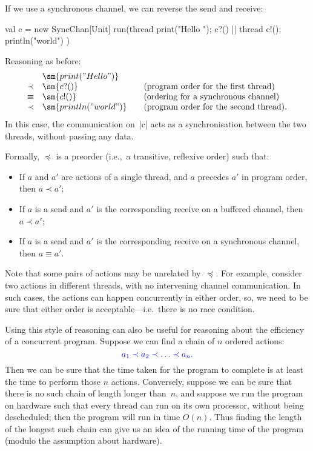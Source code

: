 If we use a synchronous channel, we can reverse the send and receive:
%
\begin{scala}
  val c = new SyncChan[Unit]
  run(thread{ print("Hello "); c?() } || thread{ c!(); println("world") })
\end{scala}
%
Reasoning as before:
\[
\begin{array}{cl@{\qquad}l}
& \sm{print("Hello ")} \\
\prec & \sm{c?()} & \mbox{(program order for the first thread)} \\
\equiv & \sm{c!()} & \mbox{(ordering for a synchronous channel)} \\
\prec & \sm{println("world")} & \mbox{(program order for the second thread).}
\end{array}
\]
In this case, the communication on~|c| acts as a synchronisation between the
two threads, without passing any data.
  
Formally, $\preceq$ is a preorder (i.e.,~a transitive, reflexive order) such
that:
%
\begin{itemize}
\item
If $a$ and $a'$ are actions of a single thread, and $a$ precedes $a'$ in
program order, then $a \prec a'$;

\item
If $a$ is a send and $a'$ is the corresponding receive on a buffered channel,
then $a \prec a'$;

\item
If $a$ is a send and $a'$ is the corresponding receive on a synchronous
channel, then $a \equiv a'$.
\end{itemize}

Note that some pairs of actions may be unrelated by~$\preceq$.  For example,
consider two actions in different threads, with no intervening channel
communication.  In such cases, the actions can happen concurrently in either
order, so, we need to be sure that either order is acceptable---i.e.~there is
no race condition.

Using this style of reasoning can also be useful for reasoning about the
efficiency of a concurrent program.  Suppose we can find a chain of $n$
ordered actions:
\[
\mstyle
a_1 \prec a_2 \prec \ldots \prec a_n. 
\]
Then we can be sure that the time taken for the program to complete is at
least the time to perform those $n$ actions.  Conversely, suppose we can be
sure that there is no such chain of length longer than~$n$, and suppose we run
the program on hardware such that every thread can run on its own processor,
without being descheduled; then the program will run in time $O(n)$.  Thus
finding the length of the longest such chain can give us an idea of the
running time of the program (modulo the assumption about hardware).

